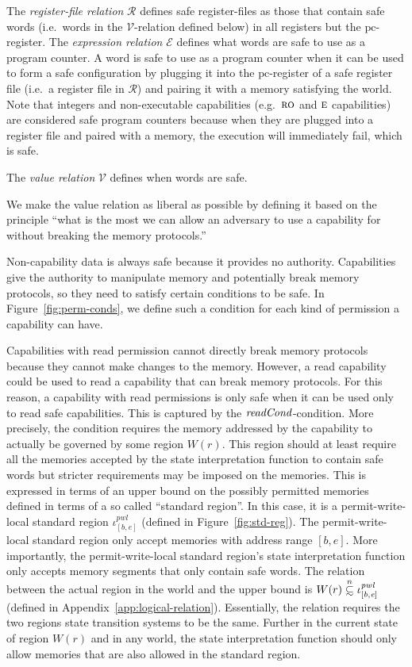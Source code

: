 \documentclass[format=acmsmall, review=true, screen=true]{acmart}
\renewcommand{\figurename}{Figure}
\newcommand\subsetsim{\mathrel{\ooalign{\raise.2ex\hbox{$\subset$}\cr
      \hidewidth\lower.8ex\hbox{\scalebox{0.9}{$\sim$}}\hidewidth\cr}}}
\newcommand{\nsubsim}[1][n]{\stackrel{\tiny{#1}}{\subsetsim}}
\newcommand{\var}[1]{\mathit{#1}}
\newcommand{\pcreg}{\mathrm{pc}}
\newcommand{\start}{\var{b}}
\newcommand{\addrend}{\var{e}}
\newcommand{\pwl}{\var{pwl}}
\newcommand{\plainfun}[2]{
  \ifthenelse{\equal{#2}{}}
  {\mathit{#1}}
  {\mathit{#1}(#2)}
}
\newcommand{\readCond}[1]{\plainfun{readCond}{#1}}
\newcommand{\asmType}{\plaindom{AsmType}}
\newcommand{\plaindom}[1]{\mathrm{#1}}
\newcommand{\UPred}[1]{\plaindom{UPred}(#1)}
\newcommand{\intr}[2]{\mathcal{#1}}
\newcommand{\valueintr}[1]{\intr{V}{#1}}
\newcommand{\exprintr}[1]{\intr{E}{#1}}
\newcommand{\regintr}[1]{\intr{R}{#1}}
\newcommand{\stdvr}{\valueintr{\asmType}}
\newcommand{\stder}{\exprintr{\asmType}}
\newcommand{\stdrr}{\regintr{\asmType}}
\newcommand{\plainperm}[1]{\textsc{#1}}
\newcommand{\readonly}{\plainperm{ro}}
\newcommand{\entry}{\plainperm{e}}
\newcommand{\tpwl}{permit-write-local standard region}
\newcommand{\itoplassug}[1]{}
\begin{document}
The \emph{register-file relation} $\stdrr$ defines safe register-files as those that contain safe words (i.e.\ words in the $\stdvr$-relation defined below) in all registers but the $\pcreg$-register.
The \emph{expression relation} $\stder$ defines what words are safe to use as a program counter.
A word is safe to use as a program counter when it can be used to form a safe configuration by plugging it into the $\pcreg$-register of a safe register file (i.e.\ a register file in $\stdrr$) and pairing it with a memory satisfying the world.
Note that integers and non-executable capabilities (e.g.\ $\readonly$ and $\entry$ capabilities) are considered safe program counters because when they are plugged into a register file and paired with a memory, the execution will immediately fail, which is safe.

The \emph{value relation} $\stdvr$ defines when words are safe.
\itoplassug{Explain why we use $\UPred{}$ with reference to the introduction of this section.}
We make the value relation as liberal as possible by defining it based on the principle ``what is the most we can allow an adversary to use a capability for without breaking the memory protocols.''

Non-capability data is always safe because it provides no authority.
Capabilities give the authority to manipulate memory and potentially break memory protocols, so they need to satisfy certain conditions to be safe.
In \figurename~\ref{fig:perm-conds}, we define such a condition for each kind of permission a capability can have.

Capabilities with read permission cannot directly break memory protocols because they cannot make changes to the memory.
However, a read capability could be used to read a capability that can break memory protocols.
For this reason, a capability with read permissions is only safe when it can be used only to read safe capabilities.
This is captured by the $\readCond{}$-condition. 
More precisely, the condition requires the memory addressed by the capability to actually be governed by some region $W(r)$.
This region should at least require all the memories accepted by the state interpretation function to contain safe words but stricter requirements may be imposed on the memories.
This is expressed in terms of an upper bound on the possibly permitted memories defined in terms of a so called ``standard region''.
In this case, it is a \tpwl{} $\iota^\pwl_{[\start,\addrend]}$ (defined in \figurename~\ref{fig:std-reg}). 
The \tpwl{} only accept memories with address range $[\start,\addrend]$.
More importantly, the \tpwl{}'s state interpretation function only accepts memory segments that only contain safe words.
The relation between the actual region in the world and the upper bound is $W(r) \nsubsim[n] \iota^\pwl_{[\start,\addrend]}$ (defined in Appendix~\ref{app:logical-relation}).
Essentially, the relation requires the two regions state transition systems to be the same. Further in the current state of region $W(r)$ and in any world, the state interpretation function should only allow memories that are also allowed in the standard region.
\end{document}
